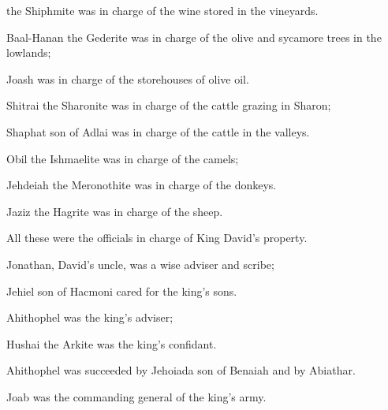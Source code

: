 {the Shiphmite
was in charge of the wine
stored
in the vineyards.
\par }{\PP {}Baal-Hanan
the Gederite
was in
charge of the olive
and sycamore
trees in the lowlands;
\par }{\PP Joash
was in
charge of the storehouses
of olive oil.
\par }{\PP {}Shitrai
the Sharonite
was in charge
of the cattle
grazing
in Sharon;
\par }{\PP Shaphat
son
of Adlai
was in charge
of the cattle
in the valleys.
\par }{\PP {}Obil
the Ishmaelite
was in charge
of the camels;
\par }{\PP Jehdeiah
the Meronothite
was in charge
of the donkeys.
\par }{\PP {}Jaziz
the Hagrite
was in charge
of the sheep.
\par }{\PP All
these
were the officials
in charge of King
David’s
property.
\par }{\PP {}Jonathan,
David’s
uncle,
was a wise adviser
and scribe;
\par }{\PP Jehiel
son
of Hacmoni
cared for the king’s
sons.
\par }{\PP {}Ahithophel
was the king’s
adviser;
\par }{\PP Hushai
the Arkite
was the king’s
confidant.
\par }{\PP {}Ahithophel
was succeeded
by Jehoiada
son
of Benaiah
and by Abiathar.
\par }{\PP Joab
was the commanding general
of the king’s
army.

}
